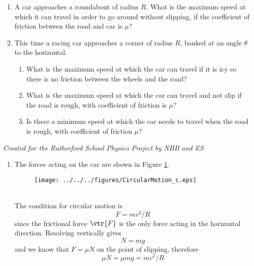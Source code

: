 

\begin{problem}
{
\begin{enumerate}
\item A car approaches a roundabout of radius $R$. What is the maximum speed at which it can travel in order to go around without slipping, if the coefficient of friction between the road and car is $\mu$?
\item This time a racing car approaches a corner of radius $R$, banked at an angle $\theta$ to the horizontal. 
\begin{enumerate}
\item What is the maximum speed at which the car can travel if it is icy so there is no friction between the wheels and the road?
\item What is the maximum speed at which the car can travel and not slip if the road is rough, with coefficient of friction is $\mu$?
\item Is there a minimum speed at which the car needs to travel when the road is rough, with coefficient of friction $\mu$?\end{enumerate} \end{enumerate}}
{\textit{Created for the Rutherford School Physics Project by NHB and ES}}
{\begin{enumerate}
\item The forces acting on the car are shown in Figure \ref{fig:CircularMotion_c}.
\begin{figure}[h]
\centering
\texttt{[image: ../../../figures/CircularMotion\_c.eps]}
\caption{}
\label{fig:CircularMotion_c}
\end{figure}
\\
The condition for circular motion is
\begin{equation*}
F=mv^2/R
\end{equation*}
since the frictional force $\vtr{F}$ is the only force acting in the horizontal direction. Resolving vertically gives
\begin{equation*}
N=mg
\end{equation*}
and we know that $F=\mu N$ on the point of slipping, therefore
\begin{equation*}
\mu N=\mu mg=mv^2/R
\end{equation*}
\begin{equation*}

\end{equation*}
\end{enumerate}}
\end{problem}
